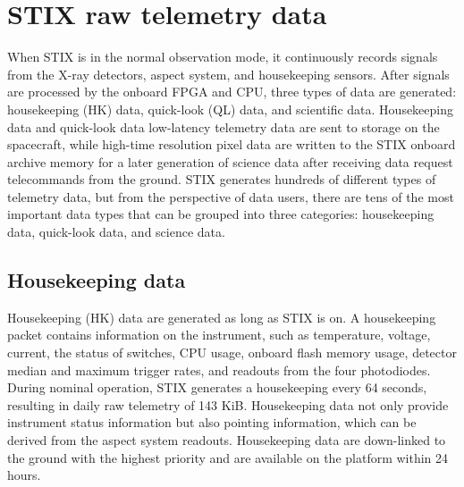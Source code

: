\documentclass[referee]{aa} %
\begin{document}
\section{STIX raw telemetry data}
\label{sec:raw-data}
When STIX is in the normal observation mode, it continuously records signals from the X-ray detectors, aspect system, and housekeeping sensors.  
After signals are processed by the onboard FPGA and CPU, three types of data are generated: housekeeping (HK) data,  quick-look (QL)  data, and scientific data.
Housekeeping data and quick-look data low-latency telemetry data are sent to storage on the spacecraft, while high-time resolution pixel data are written to the STIX onboard archive memory for a later generation of science data after receiving data request telecommands from the ground. STIX generates hundreds of different types of telemetry data, but from the perspective of data users, there are tens of the most important data types that can be grouped into three categories: housekeeping data, quick-look data, and science data.
\subsection{Housekeeping data}
Housekeeping (HK) data are generated as long as STIX is on.
A housekeeping packet contains information on the instrument,  such as temperature,
voltage, current, the status of switches, CPU usage, onboard flash memory usage, 
detector median and maximum trigger rates, and readouts from the four photodiodes.
During nominal operation, STIX generates a housekeeping every 64 seconds, 
resulting in daily raw telemetry of 143 KiB.
Housekeeping data not only provide instrument status information but also 
pointing information, which can be derived from the aspect system readouts. 
Housekeeping data are down-linked to the ground with the highest priority and are available on the platform
within 24 hours. 
\end{document}
